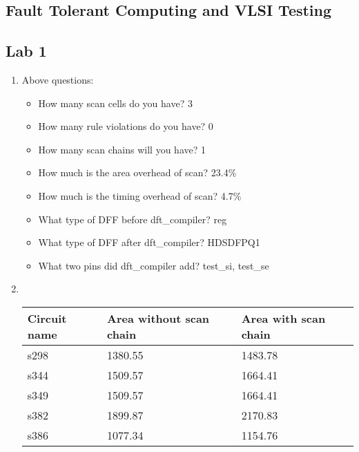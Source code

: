 \documentclass[a4paper,12pt]{article}
\begin{document}
    \begin{center}
        \section*{Fault Tolerant Computing and VLSI Testing}
        \subsection*{Lab 1}
    \end{center}

    \begin{enumerate}

        \item Above questions:

            \begin{itemize}
                \item How many scan cells do you have? 3
                \item How many rule violations do you have? 0
                \item How many scan chains will you have? 1
                \item How much is the area overhead of scan? 23.4\%
                \item How much is the timing overhead of scan? 4.7\%
                \item What type of DFF before dft\_compiler? reg
                \item What type of DFF after dft\_compiler? HDSDFPQ1
                \item What two pins did dft\_compiler add? test\_si, test\_se
            \end{itemize}

        \item \mbox{}\\

            \begin{tabularx}{\textwidth}{|X|X|X|}
                \hline
                Circuit name & Area without scan chain & Area with scan chain \\ \hline
                s298 & 1380.55 & 1483.78 \\ \hline
                s344 & 1509.57 & 1664.41 \\ \hline
                s349 & 1509.57 & 1664.41 \\ \hline
                s382 & 1899.87 & 2170.83 \\ \hline
                s386 & 1077.34 & 1154.76 \\ \hline
            \end{tabularx}


\end{enumerate}
\end{document}

